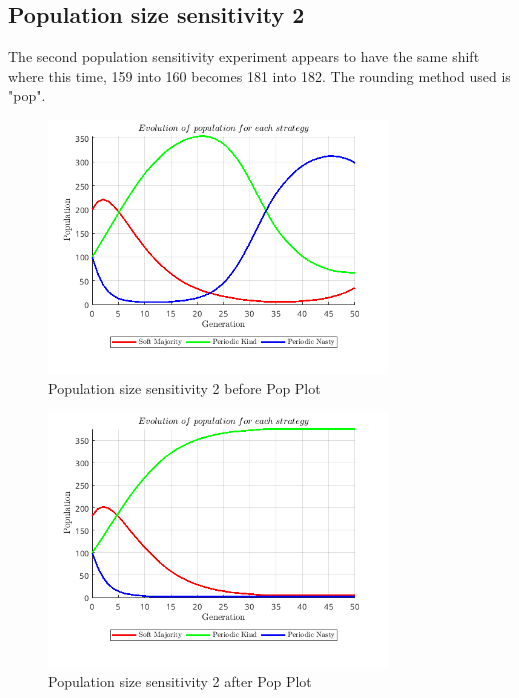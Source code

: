 \subsection{Population size sensitivity 2}
The second population sensitivity experiment appears to have the same shift where this time, 159 into 160 becomes 181 into 182. The rounding method used is "pop".
\begin{figure}[H]
    \centering
    \includegraphics[width=0.8\textwidth]{media/meetings/population_size_sensitivity_2_before_pop.png}
    \caption{Population size sensitivity 2 before Pop Plot}
\end{figure}
\begin{figure}[H]
    \centering
    \includegraphics[width=0.8\textwidth]{media/meetings/population_size_sensitivity_2_after_pop.png}
    \caption{Population size sensitivity 2 after Pop Plot}
\end{figure}

